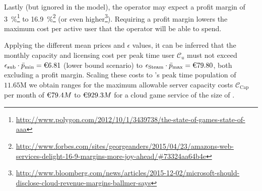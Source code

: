 Lastly (but ignored in the model), the operator may expect a profit margin of \SI{3}{\percent}\footnote{\url{http://www.polygon.com/2012/10/1/3439738/the-state-of-games-state-of-aaa}} to \SI{16.9}{\percent}\footnote{\url{http://www.forbes.com/sites/georgeanders/2015/04/23/amazons-web-services-delight-16-9-margins-more-joy-ahead/\#73324aa64b4e}} (or even higher\footnote{\url{http://www.bloomberg.com/news/articles/2015-12-02/microsoft-should-disclose-cloud-revenue-margins-ballmer-says}}). Requiring a profit margin lowers the maximum cost per active user that the operator will be able to spend.

%


%

Applying the different mean prices and $\epsilon$ values, it can be inferred that the monthly capacity and licensing cost per peak time user $\mathcal{C}_u$ must not exceed $\epsilon_{\text{sub}} \cdot \bar{p}_{\text{min}} = \text{\texteuro} 6.81$ (lower bound scenario) to $\epsilon_{\text{Steam}} \cdot \bar{p}_{\text{max}} =\text{\texteuro} 79.80$, both excluding a profit margin. Scaling these costs to \steam's peak time population of $11.65\si{\mega}$ we obtain ranges for the maximum allowable server capacity costs $\mathcal{C}_{\text{Cap}}$ per month of $\text{\texteuro} 79.4M$ to $\text{\texteuro} 929.3M$ for a cloud game service of the size of \steam.


